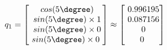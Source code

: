 \documentclass[preview]{standalone}
\begin{document}
\begin{center}
$q_1 = \begin{bmatrix}\
                    cos(5 \degree) \\\
                    sin(5 \degree) \times 1 \\\
                    sin(5 \degree) \times 0 \\\
                    sin(5 \degree) \times 0\
                \end{bmatrix} \approx \begin{bmatrix}\
                    0.996195 \\\
                    0.087156 \\\
                    0 \\\
                    0\
                \end{bmatrix}$
\end{center}
\end{document}
